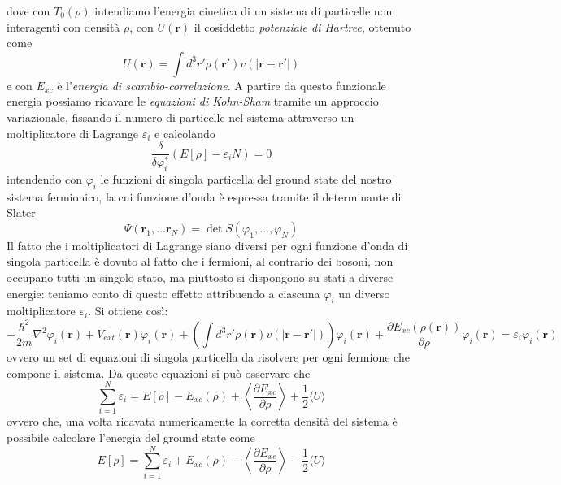 \documentclass[11pt,a4paper]{article}
\begin{document}
dove con $T_0(\rho)$ intendiamo l'energia cinetica di un sistema di particelle non interagenti con densità $\rho$, con $U(\textbf{r})$ il cosiddetto \emph{potenziale di Hartree}, ottenuto come
\[
U(\textbf{r}) = \int d^3r' \rho(\textbf{r}')v(|\textbf{r}-\textbf{r}'|)
\]
e con $E_{xc}$ è l'\emph{energia di scambio-correlazione}. A partire da questo funzionale energia possiamo ricavare le \emph{equazioni di Kohn-Sham} tramite un approccio variazionale, fissando il numero di particelle nel sistema attraverso un moltiplicatore di Lagrange $\varepsilon_i$ e calcolando
\begin{equation}
\frac{\delta}{\delta \varphi_i^*} ( E[\rho] - \varepsilon_i N) = 0
\end{equation}
intendendo con $\varphi_i$ le funzioni di singola particella del ground state del nostro sistema fermionico, la cui funzione d'onda è espressa tramite il determinante di Slater
\[
\Psi(\textbf{r}_1,\ldots \textbf{r}_N) = \det S(\varphi_1, \ldots , \varphi_N)
\]
Il fatto che i moltiplicatori di Lagrange siano diversi per ogni funzione d'onda di singola particella è dovuto al fatto che i fermioni, al contrario dei bosoni, non occupano tutti un singolo stato, ma piuttosto si dispongono su stati a diverse energie: teniamo conto di questo effetto attribuendo a ciascuna $\varphi_i$ un diverso moltiplicatore $\varepsilon_i$. Si ottiene così:
\begin{equation}
-\frac{\hbar^2}{2m}\nabla^2\varphi_i(\textbf{r}) + V_{ext}(\textbf{r})\varphi_i(\textbf{r}) + \left( \int d^3r' \rho(\textbf{r})v(|\textbf{r}-\textbf{r}'|) \right)\varphi_i(\textbf{r}) + \frac{\partial E_{xc}(\rho(\textbf{r}))}{\partial \rho}\varphi_i(\textbf{r}) = \varepsilon_i \varphi_i(\textbf{r})
\end{equation} 
ovvero un set di equazioni di singola particella da risolvere per ogni fermione che compone il sistema. Da queste equazioni si può osservare che
\[
\sum_{i=1}^N \varepsilon_i = E[\rho] - E_{xc}(\rho) + \left\langle \frac{\partial E_{xc}}{\partial \rho} \right\rangle + \frac{1}{2}\langle U \rangle
\]
ovvero che, una volta ricavata numericamente la corretta densità del sistema è possibile calcolare l'energia del ground state come
\begin{equation}\label{7}
E[\rho] = \sum_{i=1}^N \varepsilon_i + E_{xc}(\rho) - \left\langle \frac{\partial E_{xc}}{\partial \rho} \right\rangle - \frac{1}{2}\langle U \rangle
\end{equation}
\end{document}
